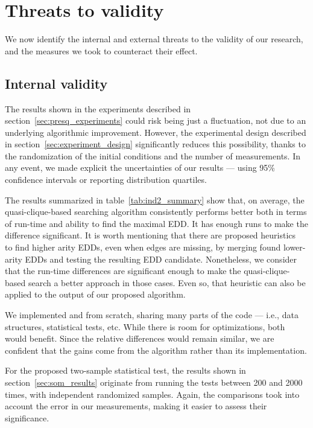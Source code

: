 \section{Threats to validity}
\label{sec:threats}

We now identify the internal and external
threats to the validity of our research, and the measures we took to
counteract their effect.

\subsection{Internal validity}

The \PresQ results shown in the experiments described in section~\ref{sec:presq_experiments}
could risk being just a fluctuation,
not due to an underlying algorithmic improvement. However,
the experimental design described in section~\ref{sec:experiment_design} significantly reduces
this possibility, thanks to the randomization of the initial conditions
and the number of measurements. In any event, we made explicit the uncertainties
of our results --- using 95\% confidence intervals or reporting distribution quartiles.

The results summarized in table~\ref{tab:ind2_summary} show that, on average, the
quasi-clique-based searching algorithm consistently performs
better both in terms of run-time and ability to find the maximal \gls{EDD}.
It has enough runs to make the difference significant.
It is worth mentioning that there are proposed heuristics~\cite{koeller2003discovery} to find higher
arity \glspl{EDD}, even when edges are missing, by merging found lower-arity
\glspl{EDD} and testing the resulting \gls{EDD} candidate.
Nonetheless, we consider that the run-time differences are significant enough to make
the quasi-clique-based search a better approach in those cases.
Even so, that heuristic can also be applied to the output of our proposed algorithm.

We implemented \Find and \PresQ from scratch, sharing 
many parts of the code --- i.e., data structures, statistical tests, etc.
While there is room for optimizations, both would benefit.
Since the relative differences would remain similar, we are confident that the gains come from the 
algorithm rather than its implementation.

\medskip

For the proposed two-sample statistical test, the results shown in
section~\ref{sec:som_results} originate from running the tests between 200 and 2000
times, with independent randomized samples.
Again, the comparisons took into account the error in our measurements,
making it easier to assess their significance.

